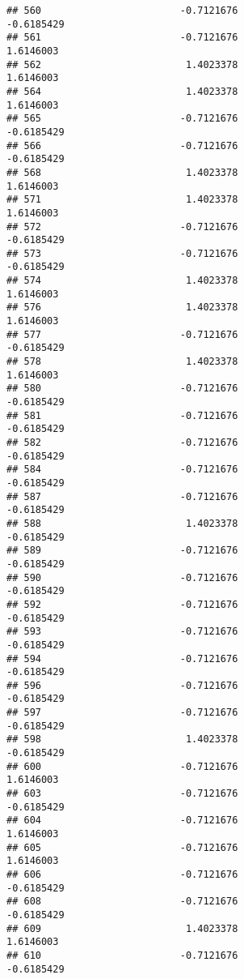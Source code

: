 \documentclass[
]{article}
\begin{document}
\begin{verbatim}
## 560                        -0.7121676                       -0.6185429
## 561                        -0.7121676                        1.6146003
## 562                         1.4023378                        1.6146003
## 564                         1.4023378                        1.6146003
## 565                        -0.7121676                       -0.6185429
## 566                        -0.7121676                       -0.6185429
## 568                         1.4023378                        1.6146003
## 571                         1.4023378                        1.6146003
## 572                        -0.7121676                       -0.6185429
## 573                        -0.7121676                       -0.6185429
## 574                         1.4023378                        1.6146003
## 576                         1.4023378                        1.6146003
## 577                        -0.7121676                       -0.6185429
## 578                         1.4023378                        1.6146003
## 580                        -0.7121676                       -0.6185429
## 581                        -0.7121676                       -0.6185429
## 582                        -0.7121676                       -0.6185429
## 584                        -0.7121676                       -0.6185429
## 587                        -0.7121676                       -0.6185429
## 588                         1.4023378                       -0.6185429
## 589                        -0.7121676                       -0.6185429
## 590                        -0.7121676                       -0.6185429
## 592                        -0.7121676                       -0.6185429
## 593                        -0.7121676                       -0.6185429
## 594                        -0.7121676                       -0.6185429
## 596                        -0.7121676                       -0.6185429
## 597                        -0.7121676                       -0.6185429
## 598                         1.4023378                       -0.6185429
## 600                        -0.7121676                        1.6146003
## 603                        -0.7121676                       -0.6185429
## 604                        -0.7121676                        1.6146003
## 605                        -0.7121676                        1.6146003
## 606                        -0.7121676                       -0.6185429
## 608                        -0.7121676                       -0.6185429
## 609                         1.4023378                        1.6146003
## 610                        -0.7121676                       -0.6185429

\end{verbatim}
\end{document}
